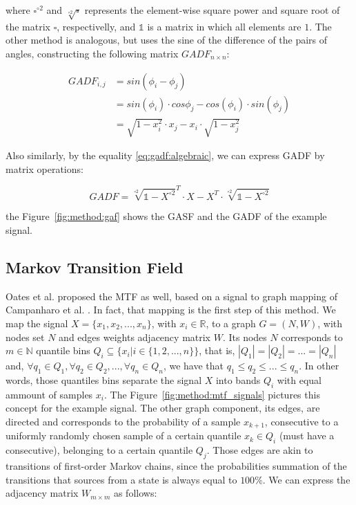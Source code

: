 \noindent where $\square^{\circ 2}$ and $\sqrt[\circ 2]{\square}$ represents the element-wise square power and square root of the matrix $\square$, respectivelly, and $\mathds{1}$ is a matrix in which all elements are $1$. The other method is analogous, but uses the sine of the difference of the pairs of angles, constructing the following matrix $GADF_{n \times n}$:

\begin{align}
    GADF_{i,j} & = sin(\phi_i - \phi_j) \\
        & = sin(\phi_i) \cdot cos{\phi_j} - cos(\phi_i) \cdot sin(\phi_j) \\
        & = \sqrt{1 - x_i^2} \cdot x_j - x_i \cdot \sqrt{1 - x_j^2}  \label{eq:gadf:algebraic}
\end{align}

\noindent Also similarly, by the equality \ref{eq:gadf:algebraic}, we can express \gls{GADF} by matrix operations:

\begin{equation}
    GADF = \sqrt[\circ 2]{\mathds{1} - X^{\circ 2}}^T \cdot X - X^T \cdot \sqrt[\circ 2]{\mathds{1} - X^{\circ 2}}
\end{equation}

\noindent the Figure~\ref{fig:method:gaf} shows the \gls{GASF} and the \gls{GADF} of the example signal.



\subsection{Markov Transition Field}



Oates et al. \cite{gaf-mtf-1} proposed the \gls{MTF} as well, based on a signal to graph mapping of Campanharo et al. \cite{mtf-1}. In fact, that mapping is the first step of this method. We map the signal $X=\{x_1,x_2,...,x_n\}$, with $x_i \in \mathbb{R}$, to a graph $G=(N,W)$, with nodes set $N$ and edges weights adjacency matrix $W$. Its nodes $N$ corresponds to $m \in \mathbb{N}$ quantile bins $Q_i \subseteq \{x_i | i \in \{1,2,...,n\}\}$, that is, $|Q_1|=|Q_2|=...=|Q_n|$ and, $\forall q_1 \in Q_1, \forall q_2 \in Q_2, ..., \forall q_n \in Q_n$, we have that $q_1 \leq q_2 \leq ... \leq q_n$. In other words, those quantiles bins separate the signal $X$ into bands $Q_i$ with equal ammount of samples $x_i$. The Figure~\ref{fig:method:mtf_signals} pictures this concept for the example signal. The other graph component, its edges, are directed and corresponds to the probability of a sample $x_{k+1}$, consecutive to a uniformly randomly chosen sample of a certain quantile $x_k \in Q_i$ (must have a consecutive), belonging to a certain quantile $Q_j$. Those edges are akin to transitions of first-order Markov chains, since the probabilities summation of the transitions that sources from a state is always equal to $100\%$. We can express the adjacency matrix $W_{m \times m}$ as follows:  

